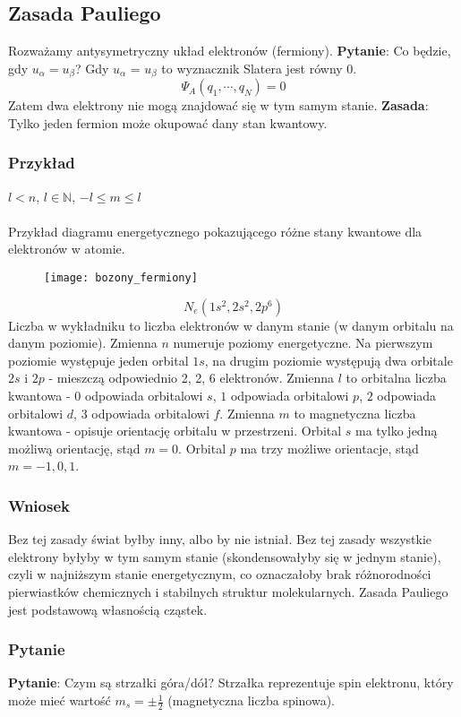 \subsection{Zasada Pauliego}
%
Rozważamy antysymetryczny układ elektronów (fermiony). \textbf{Pytanie}: Co będzie, gdy $u_\alpha = u_\beta$?
%
Gdy $u_\alpha$ = $u_\beta$ to wyznacznik Slatera jest równy 0.
%
\begin{equation*}
    \Psi_A (q_1, \cdots, q_N) = 0
\end{equation*}
%
Zatem dwa elektrony nie mogą znajdować się w tym samym stanie.
%
\textbf{Zasada}: Tylko jeden fermion może okupować dany stan kwantowy.
%
\subsubsection{Przykład}
%
$l < n$, $l \in \mathbb{N}$, $-l \leq m \leq l$
%
\\ \\
%
Przykład diagramu energetycznego pokazującego różne stany kwantowe dla elektronów w atomie.
\begin{figure}[H]
    \centering
    \texttt{[image: bozony\_fermiony]}
    \label{fig:bozony_fermiony}
\end{figure}
%
\begin{equation*}
    N_e(1s^2, 2s^2, 2p^6)
\end{equation*}
%
Liczba w wykładniku to liczba elektronów w danym stanie (w danym orbitalu na danym poziomie). Zmienna $n$ numeruje poziomy energetyczne. Na pierwszym
poziomie występuje jeden orbital $1s$, na drugim poziomie występują dwa orbitale $2s$ i $2p$ - mieszczą odpowiednio 2, 2, 6 elektronów. Zmienna $l$ to
orbitalna liczba kwantowa - $0$ odpowiada orbitalowi $s$, $1$ odpowiada orbitalowi $p$, $2$ odpowiada orbitalowi $d$, $3$ odpowiada orbitalowi $f$.
Zmienna $m$ to magnetyczna liczba kwantowa - opisuje orientację orbitalu w przestrzeni. Orbital $s$ ma tylko jedną możliwą orientację,
stąd $m = 0$. Orbital $p$ ma trzy możliwe orientacje, stąd $m = -1, 0, 1$.
\subsubsection{Wniosek}
%
Bez tej zasady świat byłby inny, albo by nie istniał. Bez tej zasady wszystkie elektrony byłyby w tym samym stanie (skondensowałyby się w jednym stanie),
czyli w najniższym stanie energetycznym, co oznaczałoby brak różnorodności pierwiastków chemicznych i stabilnych struktur molekularnych.
%
Zasada Pauliego jest podstawową własnością cząstek.
%
\subsubsection{Pytanie}
%
\textbf{Pytanie}: Czym są strzałki góra/dół? Strzałka reprezentuje spin elektronu, który może mieć wartość $m_s = \pm \frac{1}{2}$ (magnetyczna liczba spinowa).